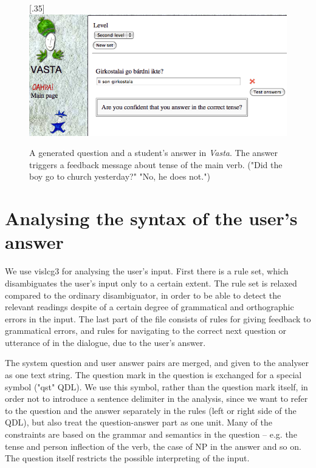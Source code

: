 \documentclass[11pt]{article}
\begin{document}
\begin{figure}[htbp]
\begin{center}
\scalebox{.35}[.35]{\includegraphics{presentation/img/Vasta_sentencegen_example.png}}\\
\caption{A generated question and a student's answer in \textit{Vasta}. The answer triggers a feedback message about tense of the main verb. ("Did the boy go to church yesterday?" 
"No, he does not.")}
\label{vastasent}
\end{center}
\end{figure}
 
\section{Analysing the syntax of the user's answer} 
We use vislcg3 for analysing the user's input. First there is a rule set, which disambiguates the user's input only to a certain extent. The rule set is relaxed compared to the ordinary disambiguator, in order to be able to detect the relevant readings despite of a certain degree of grammatical and orthographic errors in the input. The last part of the file consists of rules for giving feedback to grammatical errors, and rules for navigating to the correct next question or utterance of in the dialogue, due to the user's answer.  

The system question and user answer pairs are merged, and given to the analyser as one text string. The question mark in the question is exchanged for a special symbol ("qst" QDL). We use this symbol, rather than the question mark itself, in order not to introduce a sentence delimiter in the analysis, since we want to refer to the question and the answer separately in the rules (left or right side of the QDL), but also treat the question-answer part as one unit. Many of the constraints are based on the grammar and semantics in the question -- e.g. the tense and person inflection of the verb, the case of NP in the answer and so on. The question itself restricts the possible interpreting of the input.
\end{document}
